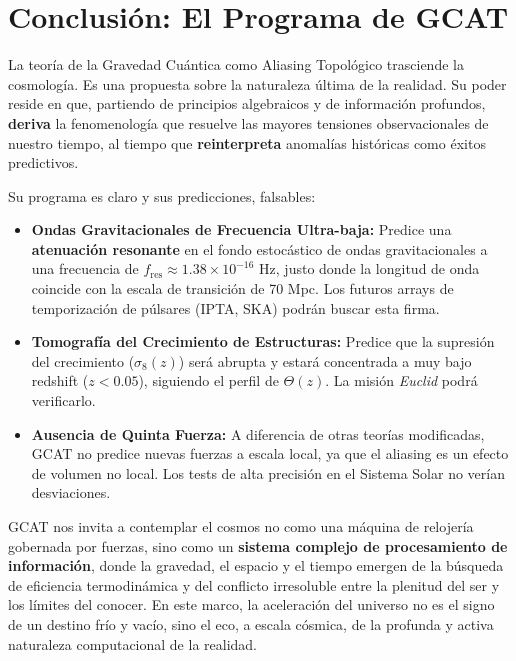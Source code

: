 \documentclass[12pt, a4paper]{article}
\begin{document}
\section{Conclusión: El Programa de GCAT}

La teoría de la Gravedad Cuántica como Aliasing Topológico trasciende la cosmología. Es una propuesta sobre la naturaleza última de la realidad. Su poder reside en que, partiendo de principios algebraicos y de información profundos, \textbf{deriva} la fenomenología que resuelve las mayores tensiones observacionales de nuestro tiempo, al tiempo que \textbf{reinterpreta} anomalías históricas como éxitos predictivos.

Su programa es claro y sus predicciones, falsables:

\begin{itemize}
    \item \textbf{Ondas Gravitacionales de Frecuencia Ultra-baja:} Predice una \textbf{atenuación resonante} en el fondo estocástico de ondas gravitacionales a una frecuencia de $f_{\text{res}} \approx 1.38 \times 10^{-16}$ Hz, justo donde la longitud de onda coincide con la escala de transición de 70 Mpc. Los futuros arrays de temporización de púlsares (IPTA, SKA) podrán buscar esta firma.
    \item \textbf{Tomografía del Crecimiento de Estructuras:} Predice que la supresión del crecimiento ($\sigma_8(z)$) será abrupta y estará concentrada a muy bajo redshift ($z < 0.05$), siguiendo el perfil de $\Theta(z)$. La misión \textit{Euclid} podrá verificarlo.
    \item \textbf{Ausencia de Quinta Fuerza:} A diferencia de otras teorías modificadas, GCAT no predice nuevas fuerzas a escala local, ya que el aliasing es un efecto de volumen no local. Los tests de alta precisión en el Sistema Solar no verían desviaciones.
\end{itemize}

GCAT nos invita a contemplar el cosmos no como una máquina de relojería gobernada por fuerzas, sino como un \textbf{sistema complejo de procesamiento de información}, donde la gravedad, el espacio y el tiempo emergen de la búsqueda de eficiencia termodinámica y del conflicto irresoluble entre la plenitud del ser y los límites del conocer. En este marco, la aceleración del universo no es el signo de un destino frío y vacío, sino el eco, a escala cósmica, de la profunda y activa naturaleza computacional de la realidad.
\end{document}
